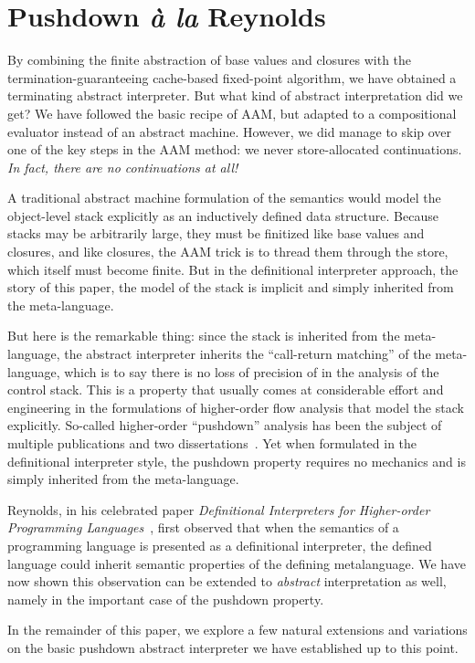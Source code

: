 \section{Pushdown \emph{à la} Reynolds}\label{s:reynolds}

By combining the finite abstraction of base values and closures with the
termination-guaranteeing cache-based fixed-point algorithm, we have obtained a
terminating abstract interpreter.  But what kind of abstract interpretation did
we get?
We have followed the basic recipe of AAM, but adapted to a compositional
evaluator instead of an abstract machine.  However, we did manage to skip over
one of the key steps in the AAM method: we never store-allocated continuations.
\emph{In fact, there are no continuations at all!}

A traditional abstract machine formulation of the semantics would model the
object-level stack explicitly as an inductively defined data structure. Because
stacks may be arbitrarily large, they must be finitized like base values and
closures, and like closures, the AAM trick is to thread them through the store,
which itself must become finite. But in the definitional interpreter approach,
the story of this paper, the model of the stack is implicit and simply
inherited from the meta-language.

But here is the remarkable thing: since the stack is inherited from the
meta-language, the abstract interpreter inherits the ``call-return matching''
of the meta-language, which is to say there is no loss of precision of in the
analysis of the control stack.  This is a property that usually comes at
considerable effort and engineering in the formulations of higher-order flow
analysis that model the stack explicitly.  So-called higher-order ``pushdown''
analysis has been the subject of multiple publications and two
dissertations~\cite%
{dvanhorn:Vardoulakis2011CFA2%
,dvanhorn:Earl2010Pushdown%
,local:vardoulakis-diss12%
,dvanhorn:VanHorn2012Systematic%
,dvanhorn:Earl2012Introspective%
,dvanhorn:Johnson2014Abstracting%
,dvanhorn:Johnson2014Pushdown%
,local:p4f%
,local:earl-diss14%
}. Yet when formulated in the definitional interpreter style, the pushdown
property requires no mechanics and is simply inherited from the meta-language.

Reynolds, in his celebrated paper \emph{Definitional Interpreters for
Higher-order Programming Languages}~\cite{dvanhorn:reynolds-acm72}, first
observed that when the semantics of a programming language is presented as a
definitional interpreter, the defined language could inherit semantic
properties of the defining metalanguage.  We have now shown this observation
can be extended to \emph{abstract} interpretation as well, namely in the
important case of the pushdown property.

In the remainder of this paper, we explore a few natural extensions and
variations on the basic pushdown abstract interpreter we have established up to
this point.
